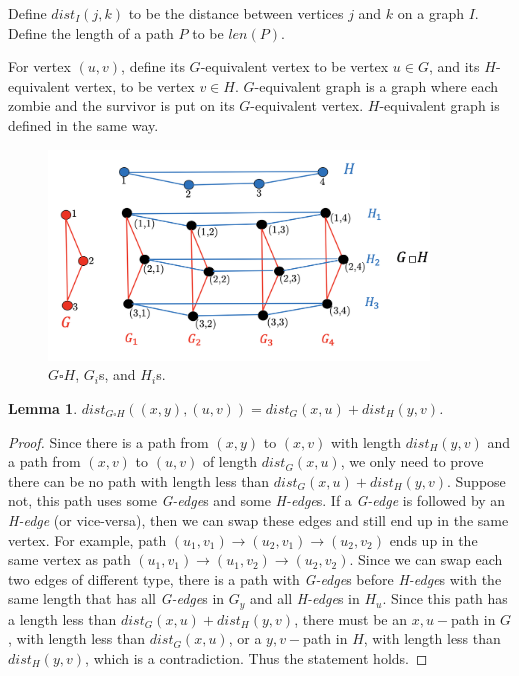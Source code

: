 \documentclass[1p]{elsarticle}
\newtheorem{lemma}[theorem]{Lemma}
\begin{document}
Define $dist_I(j,k)$ to be the distance between vertices $j$ and $k$ on a graph $I$. Define the length of a path $P$ to be $len(P)$. 

For vertex $(u,v)$, define its $G$-equivalent vertex to be vertex $u \in G$, and its $H$-equivalent vertex, to be vertex
$v \in H$. $G$-equivalent graph is a graph where each zombie and the survivor is put on its $G$-equivalent vertex.
$H$-equivalent graph is defined in the same way.


\begin{figure}[h!]
	
	\centering
	\includegraphics[width=0.9\textwidth]{fig/cp3.png}
	\caption{$G \square H$, $G_i$s, and $H_i$s.}
	\label{fig:p1}
\end{figure}



\begin{lemma} \label{shortestpathlemma}
	$dist_{G \square H}((x,y),(u,v)) = dist_G(x,u) + dist_H(y,v)$.
\end{lemma}
\begin{proof}
	Since there is a path from $(x,y)$ to $(x,v)$ with length $dist_H(y,v)$ and a path from $(x,v)$ to $(u,v)$ of length
	$dist_G(x,u)$, we only need to prove there can be no path with length less than $dist_G(x,u) + dist_H(y,v)$. Suppose
	not, this path uses some {\it G-edge}s and some {\it H-edge}s. If a {\it G-edge} is followed by an {\it H-edge} (or
	vice-versa), then we can swap these edges and still end up in the same vertex. For example, path $(u_1,v_1) \rightarrow
	(u_2,v_1) \rightarrow (u_2,v_2)$ ends up in the same vertex as path $(u_1,v_1) \rightarrow (u_1,v_2) \rightarrow
	(u_2,v_2)$. Since we can swap each two edges of different type, there is a path with {\it G-edge}s before {\it
	H-edge}s with the same length that has all {\it G-edge}s in $G_y$ and all {\it H-edge}s in $H_u$. Since this path
	has a length less than $dist_G(x,u) + dist_H(y,v)$, there must be an $x,u-$path in $G$, with length less than
	$dist_G(x,u)$, or a $y,v-$path in $H$, with length less than $dist_H(y,v)$, which is a contradiction. Thus the
	statement holds.
\end{proof}
\end{document}
